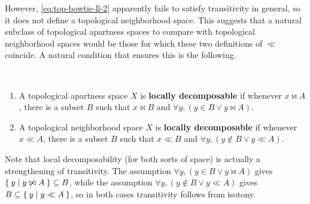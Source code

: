 \documentclass{article}
\begin{document}
However, \eqref{eq:top-bowtie-ll-2} apparently fails to satisfy transitivity in general, so it does not define a topological neighborhood space.
This suggests that a natural subclass of topological apartness spaces to compare with topological neighborhood spaces would be those for which these two definitions of $\ll$ coincide.
A natural condition that ensures this is the following.

\begin{defn}\ 
  \begin{enumerate}
  \item A topological apartness space $X$ is \textbf{locally decomposable} if whenever $x\bowtie A$, there is a subset $B$ such that $x\bowtie B$ and $\forall y, (y\in B \lor y\bowtie A)$.
  \item A topological neighborhood space $X$ is \textbf{locally decomposable} if whenever $x\ll A$, there is a subset $B$ such that $x\ll B$ and $\forall y, (y\notin B \lor y \ll A)$.
  \end{enumerate}
\end{defn}

Note that local decomposability (for both sorts of space) is actually a strengthening of transitivity.
The assumption $\forall y, (y\in B \lor y\bowtie A)$ gives $\Set{y|y\not\bowtie A} \subseteq B$, while the assumption $\forall y, (y\notin B \lor y \ll A)$ gives $B\subseteq \Set{y|y\ll A}$, so in both cases transitivity follows from isotony.
\end{document}
